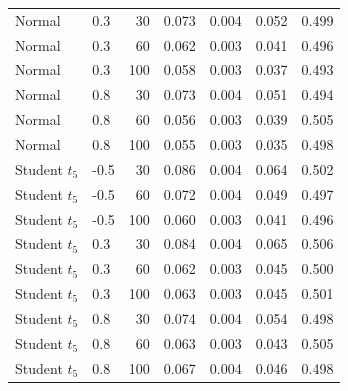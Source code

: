 \documentclass[11pt]{article}
\theoremstyle{remark}
\begin{document}
\begin{longtable}{llrrrrr}
Normal & 0.3 & 30 & 0.073 & 0.004 & 0.052 & 0.499 \\
Normal & 0.3 & 60 & 0.062 & 0.003 & 0.041 & 0.496 \\
Normal & 0.3 & 100 & 0.058 & 0.003 & 0.037 & 0.493 \\
Normal & 0.8 & 30 & 0.073 & 0.004 & 0.051 & 0.494 \\
Normal & 0.8 & 60 & 0.056 & 0.003 & 0.039 & 0.505 \\
Normal & 0.8 & 100 & 0.055 & 0.003 & 0.035 & 0.498 \\
Student $t_5$ & -0.5 & 30 & 0.086 & 0.004 & 0.064 & 0.502 \\
Student $t_5$ & -0.5 & 60 & 0.072 & 0.004 & 0.049 & 0.497 \\
Student $t_5$ & -0.5 & 100 & 0.060 & 0.003 & 0.041 & 0.496 \\
Student $t_5$ & 0.3 & 30 & 0.084 & 0.004 & 0.065 & 0.506 \\
Student $t_5$ & 0.3 & 60 & 0.062 & 0.003 & 0.045 & 0.500 \\
Student $t_5$ & 0.3 & 100 & 0.063 & 0.003 & 0.045 & 0.501 \\
Student $t_5$ & 0.8 & 30 & 0.074 & 0.004 & 0.054 & 0.498 \\
Student $t_5$ & 0.8 & 60 & 0.063 & 0.003 & 0.043 & 0.505 \\
Student $t_5$ & 0.8 & 100 & 0.067 & 0.004 & 0.046 & 0.498 \\
\end{longtable}
\end{document}
